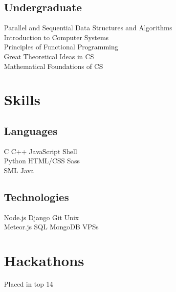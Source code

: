 \documentclass[]{deedy-resume-openfont}
\begin{document}
\begin{minipage}[t]{0.33\textwidth}
\subsection{Undergraduate}
Parallel and Sequential Data Structures and Algorithms\\
Introduction to Computer Systems\\
Principles of Functional Programming\\
Great Theoretical Ideas in CS\\
Mathematical Foundations of CS\\
\sectionsep


\section{Skills}
\subsection{Languages}
C \textbullet{} C++ \textbullet{} JavaScript \textbullet{} Shell \\
Python \textbullet{}  HTML/CSS \textbullet{} Sass \\
SML \textbullet{} Java \\
\sectionsep

\subsection{Technologies}
Node.js \textbullet{} Django \textbullet{} Git \textbullet{} Unix\\
Meteor.js \textbullet{} SQL \textbullet{} MongoDB \textbullet{} VPSs
\sectionsep


\section{Hackathons} 
\vspace{\topsep} %
\begin{tightemize}
\item Placed in top 14
\end{tightemize}


\end{minipage}
\end{document}
